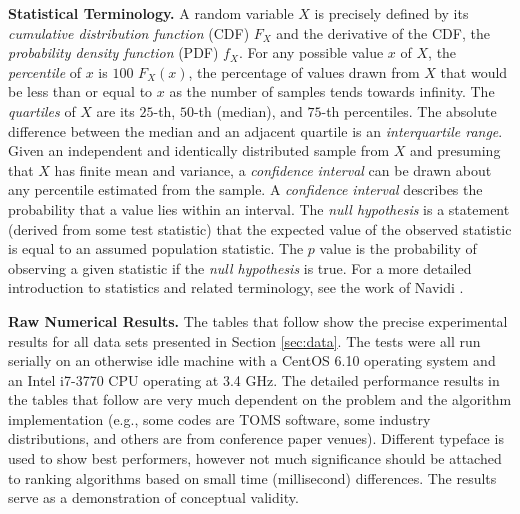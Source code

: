 \begin{normalsize}
\textbf{Statistical Terminology.} A random variable $X$ is precisely
defined by its \textit{cumulative distribution function} (CDF) $F_X$
and the derivative of the CDF, the \textit{probability density
  function} (PDF) $f_X.$ For any possible value $x$ of $X$, the
\textit{percentile} of $x$ is $100$ $F_X(x)$, the percentage of values
drawn from $X$ that would be less than or equal to $x$ as the number
of samples tends towards infinity. The \textit{quartiles} of $X$ are
its $25$-th, $50$-th (median), and $75$-th percentiles. The absolute
difference between the median and an adjacent quartile is an
\textit{interquartile range}. Given an independent and identically
distributed sample from $X$ and presuming that $X$ has finite mean and
variance, a \textit{confidence interval} can be drawn about any
percentile estimated from the sample. A \textit{confidence interval}
describes the probability that a value lies within an interval. The
\textit{null hypothesis} is a statement (derived from some test
statistic) that the expected value of the observed statistic is equal
to an assumed population statistic. The $p$ value is the probability
of observing a given statistic if the \textit{null hypothesis} is
true. For a more detailed introduction to statistics and 
related terminology, see the work of Navidi \cite{navidi_2015}.

\vspace{4mm}
\noindent \textbf{Raw Numerical Results.} The tables that follow show the
precise experimental results for all data sets presented in Section
\ref{sec:data}. The tests were all run serially on an otherwise idle
machine with a CentOS 6.10 operating system and an Intel i7-3770 CPU
operating at 3.4 GHz. The detailed performance results in the tables
that follow are very much dependent on the problem and the algorithm
implementation (e.g., some codes are TOMS software, some industry
distributions, and others are from conference paper venues). Different
typeface is used to show best performers, however not much
significance should be attached to ranking algorithms based on small
time (millisecond) differences. The results serve as a demonstration
of conceptual validity.

\end{normalsize}

